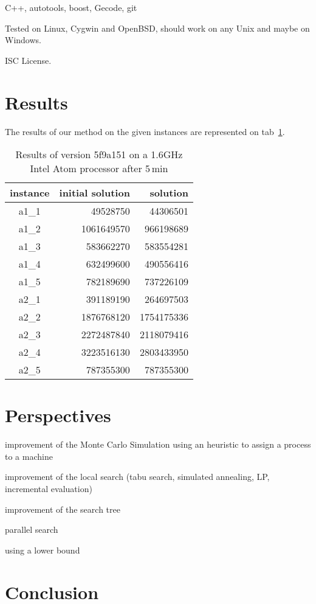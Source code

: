 \documentclass[a4paper,twocolumn]{article}
\begin{document}
C++, autotools, boost, Gecode, git

Tested on Linux, Cygwin and OpenBSD, should work on any Unix and maybe
on Windows.

ISC License.

\section{Results}

The results of our method on the given instances are represented on
tab~\ref{tab:results}.

\begin{table}
  \centering
  \label{tab:results}
  \caption{Results of version 5f9a151 on a 1.6GHz Intel Atom processor
    after 5\,min}
  \begin{tabular}{|c|r|r|}
    \hline
    instance & initial solution & solution\\
    \hline
    a1\_1 &   49528750 &   44306501\\
    a1\_2 & 1061649570 &  966198689\\
    a1\_3 &  583662270 &  583554281\\
    a1\_4 &  632499600 &  490556416\\
    a1\_5 &  782189690 &  737226109\\
    a2\_1 &  391189190 &  264697503\\
    a2\_2 & 1876768120 & 1754175336\\
    a2\_3 & 2272487840 & 2118079416\\
    a2\_4 & 3223516130 & 2803433950\\
    a2\_5 &  787355300 &  787355300\\
    \hline
  \end{tabular}
\end{table}

\section{Perspectives}

improvement of the Monte Carlo Simulation using an heuristic to assign
a process to a machine

improvement of the local search (tabu search, simulated annealing, LP,
incremental evaluation)

improvement of the search tree

parallel search

using a lower bound

\section{Conclusion}


\end{document}
